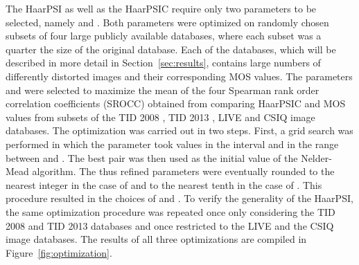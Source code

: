 \documentclass[11pt,a4paper]{article}
\begin{document}
The HaarPSI as well as the HaarPSIC require only two parameters to be selected, namely  and . Both parameters were optimized on randomly chosen subsets of four large publicly available databases, where each subset was a quarter the size of the original database. Each of the databases, which will be described in more detail in Section~\ref{sec:results}, contains large numbers of differently distorted images and their corresponding MOS values.
The parameters  and  were selected to maximize the mean of the four Spearman rank order correlation coefficients (SROCC) obtained from comparing HaarPSIC and MOS values from subsets of the TID 2008 \cite{PLZECB2009}, TID 2013  \cite{Ponomarenko2015}, LIVE \cite{SWCBOnline} and CSIQ \cite{LaCh2010} image databases. The optimization was carried out in two steps. First, a grid search was performed in which the parameter  took values in the interval  and  in the range between  and . The best  pair was then used as the initial value of the Nelder-Mead algorithm. The thus refined parameters were eventually rounded to the nearest integer in the case of  and to the nearest tenth in the case of . This procedure resulted in the choices of  and .
To verify the generality of the HaarPSI, the same optimization procedure was repeated once only considering the TID 2008 and TID 2013 databases and once restricted to the LIVE and the CSIQ image databases. The results of all three optimizations are compiled in Figure~\ref{fig:optimization}.
\end{document}
